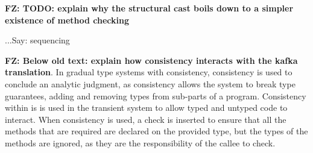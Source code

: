 \documentclass[acmlarge, anonymous, authordraft, review]{acmart} %
\newcommand{\FZ}[1]{\textbf{FZ: #1}}
\begin{document}
\FZ{TODO: explain why the structural cast boils down to a simpler existence of method checking}

...Say: sequencing

%
%

\FZ{Below old text: explain how consistency interacts with the kafka translation}.
 In gradual type systems with consistency, consistency is used to
conclude an analytic judgment, as consistency allows the system to break
type guarantees, adding and removing types from sub-parts of  a
program. Consistency within \kafka is is used in the transient system to allow typed and untyped code to
interact. When consistency is used, a check is inserted to ensure that all
the methods that are required are declared on the provided type, but the
types of the methods are ignored, as they are the responsibility of the
callee to check.
\end{document}

